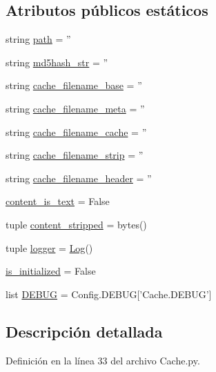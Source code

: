 \subsection*{Atributos públicos estáticos}
\begin{DoxyCompactItemize}
\item 
string \hyperlink{class_cache_1_1_file_cache_aa3e48c8aceb54811558590d05769af11}{path} = ''
\item 
string \hyperlink{class_cache_1_1_file_cache_a94712bab05ce67c5a20c3e2cfba47509}{md5hash\-\_\-str} = ''
\item 
string \hyperlink{class_cache_1_1_file_cache_a643dfb38067e5c4785397ef0e8c20944}{cache\-\_\-filename\-\_\-base} = ''
\item 
string \hyperlink{class_cache_1_1_file_cache_ab6e30d3196eea1c3cae1186945c8e0e2}{cache\-\_\-filename\-\_\-meta} = ''
\item 
string \hyperlink{class_cache_1_1_file_cache_abf7b20e99585e8ff1fd1c205eb02c2b3}{cache\-\_\-filename\-\_\-cache} = ''
\item 
string \hyperlink{class_cache_1_1_file_cache_a2f7d1283375128a83f657d9eb2ed5d3d}{cache\-\_\-filename\-\_\-strip} = ''
\item 
string \hyperlink{class_cache_1_1_file_cache_a27cec37d2b4d4aac26eb0999e220031e}{cache\-\_\-filename\-\_\-header} = ''
\item 
\hyperlink{class_cache_1_1_file_cache_afda3d5760616e47bd8fda4fe7490d7a9}{content\-\_\-is\-\_\-text} = False
\item 
tuple \hyperlink{class_cache_1_1_file_cache_a6add3c86ea9523a23c289b660d064e57}{content\-\_\-stripped} = bytes()
\item 
tuple \hyperlink{class_cache_1_1_file_cache_a7ebf67b0706f9ce71f54cdfadacbfe2e}{logger} = \hyperlink{class_log_1_1_log}{Log}()
\item 
\hyperlink{class_cache_1_1_file_cache_a8582c66c170deb664f9e7cd78b21d6b1}{is\-\_\-initialized} = False
\item 
list \hyperlink{class_cache_1_1_file_cache_a263cdec129a60caf90b7c6d5eb5c64f3}{D\-E\-B\-U\-G} = Config.\-D\-E\-B\-U\-G\mbox{[}'Cache.\-D\-E\-B\-U\-G'\mbox{]}
\end{DoxyCompactItemize}


\subsection{Descripción detallada}


Definición en la línea 33 del archivo Cache.\-py.



